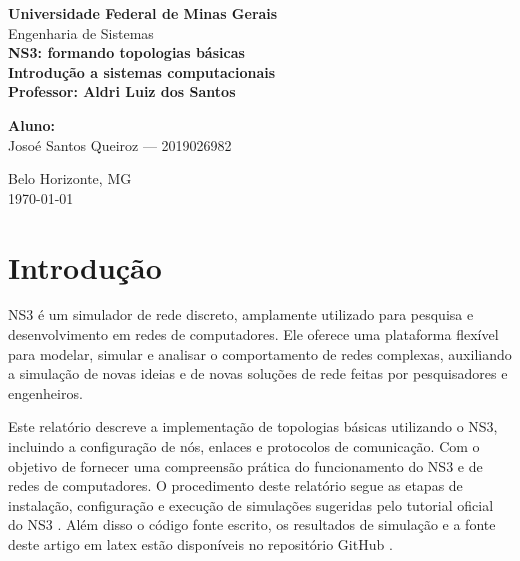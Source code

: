 \documentclass[12pt,a4paper]{article}
\begin{document}

\graphicspath{{../img/}}


\begin{titlepage}
    \centering
    {\Large \textbf{Universidade Federal de Minas Gerais}}\\[0.3cm]
    {\large Engenharia de Sistemas}\\[2cm]

    {\Huge \textbf{NS3: formando topologias básicas}}\\[1.5cm]

    \textbf{Introdução a sistemas computacionais}\\[0.5cm]
    \textbf{Professor: Aldri Luiz dos Santos}\\[1.5cm]
    
    \begin{flushleft}
        \textbf{Aluno:}\\
        Josoé Santos Queiroz --- 2019026982
    \end{flushleft}
    
    \vfill
    {\large Belo Horizonte, MG}\\
    {\large \today}
\end{titlepage}

\clearpage
\tableofcontents
\clearpage

\section{Introdução}

NS3 é um simulador de rede discreto, amplamente utilizado para pesquisa e desenvolvimento em redes de computadores. Ele oferece uma plataforma flexível para modelar, simular e analisar o comportamento de redes complexas, auxiliando a simulação de novas ideias e de novas soluções de rede feitas por pesquisadores e engenheiros.

Este relatório descreve a implementação de topologias básicas utilizando o NS3, incluindo a configuração de nós, enlaces e protocolos de comunicação. Com o objetivo de fornecer uma compreensão prática do funcionamento do NS3 e de redes de  computadores. O procedimento deste relatório segue as etapas de instalação, configuração e execução de simulações sugeridas pelo tutorial oficial do NS3 \cite{ns3_tutorial}. Além disso o código fonte escrito, os resultados de simulação e a fonte deste artigo em latex estão disponíveis no repositório GitHub \cite{tp1_repo}.
\end{document}
